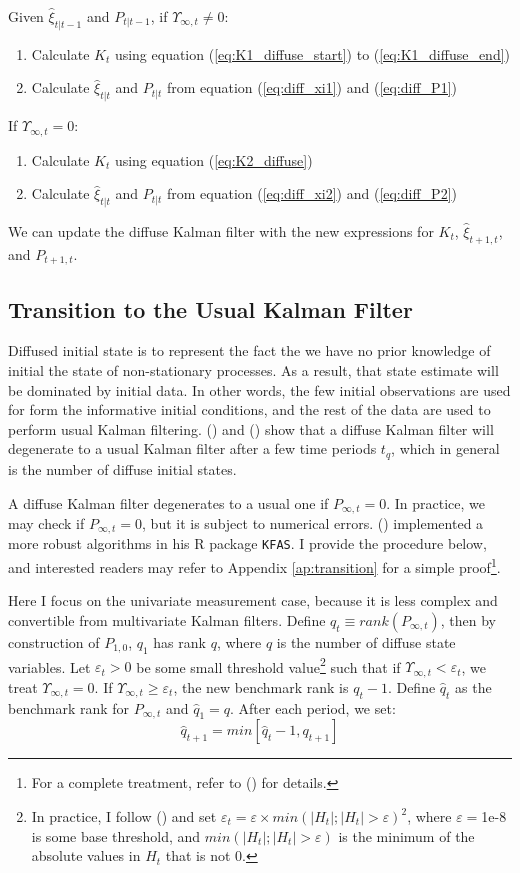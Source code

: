\documentclass[10pt]{article}
\newenvironment{boenumerate}
    {\begin{enumerate}\renewcommand\labelenumi{\textbf\theenumi}}
    {\end{enumerate}}
\numberwithin{equation}{section}
\begin{document}
Given $\hat{\xi}_{t|t-1}$ and $P_{t|t-1}$, if $\Upsilon_{\infty,t}\neq 0$:
\begin{boenumerate}
    \item Calculate $K_t$ using equation (\ref{eq:K1_diffuse_start}) to (\ref{eq:K1_diffuse_end})
    \item Calculate $\hat{\xi}_{t|t}$ and $P_{t|t}$ from equation (\ref{eq:diff_xi1}) and (\ref{eq:diff_P1})
\end{boenumerate}

If $\Upsilon_{\infty,t}=0$:
\begin{boenumerate}
    \item Calculate $K_t$ using equation (\ref{eq:K2_diffuse})
    \item Calculate $\hat{\xi}_{t|t}$ and $P_{t|t}$ from equation (\ref{eq:diff_xi2}) and (\ref{eq:diff_P2})
\end{boenumerate}

We can update the diffuse Kalman filter with the new expressions for $K_t$, $\hat{\xi}_{t+1,t}$, and $P_{t+1,t}$.

\subsection{Transition to the Usual Kalman Filter}
Diffused initial state is to represent the fact the we have no prior knowledge of initial the state of non-stationary processes. As a result, that state estimate will be dominated by initial data. In other words, the few initial observations are used for form the informative initial conditions, and the rest of the data are used to perform usual Kalman filtering. (\cite{dejong_1991}) and (\cite{durbin_koopman_2003}) show that a diffuse Kalman filter will degenerate to a usual Kalman filter after a few time periods $t_q$, which in general is the number of diffuse initial states. 

A diffuse Kalman filter degenerates to a usual one if $P_{\infty,t}=0$. In practice, we may check if $P_{\infty,t}=0$, but it is subject to numerical errors. (\cite{helske_2016}) implemented a more robust algorithms in his R package \texttt{KFAS}. I provide the procedure below, and interested readers may refer to Appendix \ref{ap:transition} for a simple proof\footnote{For a complete treatment, refer to (\cite{koopman_1997}) for details.}. 

Here I focus on the univariate measurement case, because it is less complex and convertible from multivariate Kalman filters. Define $q_t\equiv rank(P_{\infty,t})$, then by construction of $P_{1,0}$, $q_1$ has rank $q$, where $q$ is the number of diffuse state variables. Let $\varepsilon_t>0$ be some small threshold value\footnote{In practice, I follow (\cite{helske_2016}) and set $\varepsilon_t=\varepsilon\times min(|H_t|;|H_t|>\varepsilon)^2$,  where $\varepsilon=$1e-8 is some base threshold, and $min(|H_t|;|H_t|>\varepsilon)$ is the minimum of the absolute values in $H_t$ that is not $0$.} such that if $\Upsilon_{\infty,t}<\varepsilon_t$, we treat $\Upsilon_{\infty,t}=0$. If $\Upsilon_{\infty,t}\geq \varepsilon_t$, the new benchmark rank is $q_t-1$. Define $\hat{q}_t$ as the benchmark rank for $P_{\infty,t}$ and $\hat{q}_1=q$. After each period, we set: 
\[
    \hat{q}_{t+1}=min[\hat{q}_t-1,q_{t+1}]
\]
\end{document}
